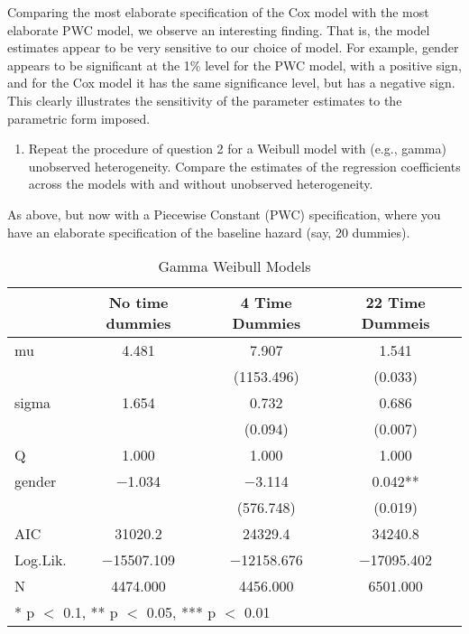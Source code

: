 \documentclass[
]{article}
\providecommand{\tightlist}{%
  \setlength{\itemsep}{0pt}\setlength{\parskip}{0pt}}
\begin{document}
Comparing the most elaborate specification of the Cox model with the
most elaborate PWC model, we observe an interesting finding. That is,
the model estimates appear to be very sensitive to our choice of model.
For example, gender appears to be significant at the 1\% level for the
PWC model, with a positive sign, and for the Cox model it has the same
significance level, but has a negative sign. This clearly illustrates
the sensitivity of the parameter estimates to the parametric form
imposed.

\clearpage

\begin{enumerate}
\def\labelenumi{\arabic{enumi}.}
\setcounter{enumi}{4}
\tightlist
\item
  Repeat the procedure of question 2 for a Weibull model with (e.g.,
  gamma) unobserved heterogeneity. Compare the estimates of the
  regression coefficients across the models with and without unobserved
  heterogeneity.
\end{enumerate}

As above, but now with a Piecewise Constant (PWC) specification, where
you have an elaborate specification of the baseline hazard (say, 20
dummies).

\begin{table}[!h]

\caption{\label{tab:unnamed-chunk-25}Gamma Weibull Models}
\centering
\fontsize{9}{11}\selectfont
\begin{tabular}[t]{lccc}
\toprule
  & No time dummies & 4 Time Dummies & 22 Time Dummeis\\
\midrule
mu & \num{4.481} & \num{7.907} & \num{1.541}\\
 &  & (\num{1153.496}) & (\num{0.033})\\
sigma & \num{1.654} & \num{0.732} & \num{0.686}\\
 &  & (\num{0.094}) & (\num{0.007})\\
Q & \num{1.000} & \num{1.000} & \num{1.000}\\
gender & \num{-1.034} & \num{-3.114} & \num{0.042}**\\
 &  & (\num{576.748}) & (\num{0.019})\\
AIC & \num{31020.2} & \num{24329.4} & \num{34240.8}\\
\midrule
Log.Lik. & \num{-15507.109} & \num{-12158.676} & \num{-17095.402}\\
N & \num{4474.000} & \num{4456.000} & \num{6501.000}\\
\bottomrule
\multicolumn{4}{l}{\rule{0pt}{1em}* p $<$ 0.1, ** p $<$ 0.05, *** p $<$ 0.01}\\
\end{tabular}
\end{table}
\end{document}
